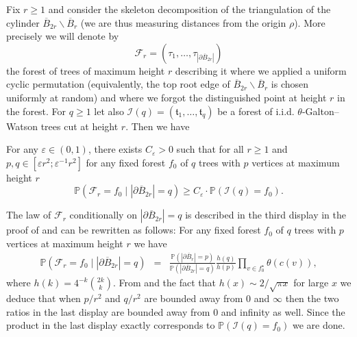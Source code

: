 \documentclass[10pt]{amsart}
\theoremstyle{definition}\newtheorem{defi}[theo]{Definition}\newtheorem{rema}[theo]{Remark}\newtheorem{exam}[theo]{Example}\newtheorem{exem}[theo]{Example}\newtheorem{nota}[theo]{Notation}
\begin{document}
 Fix $r \geq 1$ and consider the skeleton decomposition of the triangulation of the cylinder $ \overline{B}_{2r} \backslash \overline{B}_{r}$ (we are thus measuring distances from the origin $\rho$). More precisely we will denote by $$ \mathcal{F}_{r} = (\tau_{1}, \dots , \tau_{| \partial \overline{B}_{2r}|})$$ the forest of trees of maximum height $r$ describing it where we applied a uniform cyclic permutation (equivalently, the top root edge of $\overline{B}_{2r} \backslash \overline{B}_{r}$ is chosen uniformly at random) and where we forgot the distinguished point at height $r$ in the forest. For $q \geq 1$ let also $ \mathcal{I}(q) = (  \mathfrak{t}_{1}, \dots , \mathfrak{t}_{q})$ be a forest of i.i.d. $\theta$-Galton--Watson trees cut at height $r$. Then we have
 \begin{lemma} \label{lem:comparison} For any $ \varepsilon \in (0,1)$, there exists $C_{\varepsilon}>0$ such that for all $r\geq 1$ and $ p,q  \in [ \varepsilon r^{2};  \varepsilon^{-1} r^{2}]$ for any fixed forest $f_{0}$ of $q$  trees with $p$ vertices at maximum height $r$
 $$ \mathbb{P}( \mathcal{F}_{r} = f_{0} \mid | \partial \overline{B}_{2r}| = q) \geq C_{\varepsilon} \cdot \mathbb{P}( \mathcal{I}(q) = f_{0}).$$
 \end{lemma}
 \proof The law of $ \mathcal{F}_{r}$ conditionally on $| \partial \overline{B}_{2r}| = q$ is described in the third display in the proof of \cite[Proposition 5]{CLGfpp} and can be rewritten as follows: For any  fixed forest $f_{0}$ of $q$ trees with $p$ vertices at maximum height $r$ we have
 \begin{eqnarray} \mathbb{P}( \mathcal{F}_{r} = f_{0} \mid | \partial \overline{B}_{2r}| = q) &=&  \frac{\mathbb{P}( |\partial \overline{B}_{r}|=p)}{ \mathbb{P}(| \partial \overline{B}_{2r}| = q)} \frac{h(q)}{h(p)} \prod_{v \in f_{0}^{\star}} \theta(c(v)), %
\end{eqnarray}
where $h(k)= 4^{-k}{\binom{2k}{k}}$. From \cite[Remark 3]{CLGfpp} and the fact that $ h(x) \sim 2/ \sqrt{\pi x}$ for large $x$ we deduce that when $p/r^{2}$ and $q/r^{2}$ are bounded away from $0$ and $\infty$ then the two ratios in the last display are bounded away from $0$ and infinity as well. Since the product in the last display exactly corresponds to $\mathbb{P}( \mathcal{I}(q) = f_{0})$ we are done. \endproof
\end{document}
